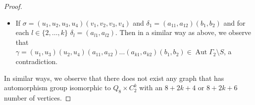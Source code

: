 \documentclass[12pt]{article}
\theoremstyle{plain}
\theoremstyle{definition}
\newcommand{\Aut}{\mathop{\mathrm{Aut}}}
\begin{document}
\begin{proof}
\begin{itemize}
			Observe that 
			\begin{align*}
				&\gamma([u_{i}, u_{j}]) = \sigma^{2}([u_{i}, u_{j}]) = \gamma([u_{i}, b_{1}]) = \gamma([v_{i}, b_{1}]) , \\
				& \gamma([u_{i}, v_{j}]) = \sigma^{i+j}\tau ([u_{i}, v_{j}]), \\
				&\gamma([u_{i}, a_{l1}]) = \sigma^{2} \delta_{1} \delta_{2} \ldots \delta_{k} ([u_{i}, a_{l1}]) = \gamma([u_{i}, a_{l2}]),\\
				&\gamma([v_{i}, v_{j}]) = e = \gamma([b_{1}, b_{2}]),\\
				&\gamma([v_{i}, a_{l1}]) = \delta_{1} \delta_{2} \ldots \delta_{k} ([v_{i}, a_{l1}]) = \gamma([v_{i}, a_{l2}]), \\
				&\gamma([a_{l1}, a_{m2}]) = \delta_{1} \delta_{2} \ldots \delta_{k} ([a_{l1}, a_{m2}]) = \gamma([b_{1}, a_{l1}]) = \gamma([b_{1}, a_{l2}]) .\\
			\end{align*}
			Hence $\gamma \in \Aut \Gamma_{2} \setminus S$, which is a contradiction.
			
			\item [(b)]   If $\sigma = (u_{1}, u_{2}, u_{3}, u_{4})(v_{1}, v_{2}, v_{3}, v_{4})$ and $\delta_{1} = (a_{11}, a_{12})(b_{1}, b_{2})$  and for each $l \in \{2,\ldots,k\}$ $\delta_{l} = (a_{l1}, a_{l2})$. Then in a similar way as above, we observe that\\
			$\gamma = (u_{1}, u_{3}) (u_{2}, u_{4})(a_{11}, a_{12})\ldots(a_{k1}, a_{k2})(b_{1}, b_{2}) \in \Aut \Gamma_{2} \setminus S$, a contradiction.
		\end{itemize}
		
		
		In similar ways, we observe that there does not exist any graph that has automorphism group isomorphic to $Q_{8} \times C_{2}^{k}$ with an $8+2k+4$ or $8+2k+6$ number of vertices.    
	\end{proof}
	
\end{document}
